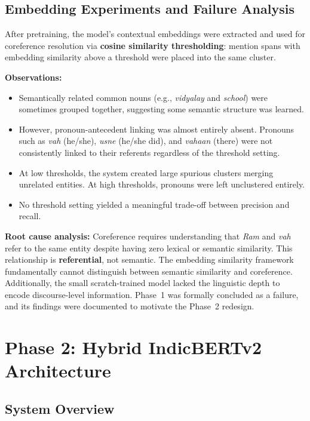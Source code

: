 \documentclass[12pt,a4paper]{report}
\begin{document}
\subsection{Embedding Experiments and Failure Analysis}

After pretraining, the model's contextual embeddings were extracted and used for coreference resolution via \textbf{cosine similarity thresholding}: mention spans with embedding similarity above a threshold were placed into the same cluster.

\textbf{Observations:}
\begin{itemize}
    \item Semantically related common nouns (e.g., \textit{vidyalay} and \textit{school}) were sometimes grouped together, suggesting some semantic structure was learned.
    \item However, pronoun-antecedent linking was almost entirely absent. Pronouns such as \textit{vah} (he/she), \textit{usne} (he/she did), and \textit{vahaan} (there) were not consistently linked to their referents regardless of the threshold setting.
    \item At low thresholds, the system created large spurious clusters merging unrelated entities. At high thresholds, pronouns were left unclustered entirely.
    \item No threshold setting yielded a meaningful trade-off between precision and recall.
\end{itemize}

\textbf{Root cause analysis:}
Coreference requires understanding that \textit{Ram} and \textit{vah} refer to the same entity despite having zero lexical or semantic similarity. This relationship is \textbf{referential}, not semantic. The embedding similarity framework fundamentally cannot distinguish between semantic similarity and coreference. Additionally, the small scratch-trained model lacked the linguistic depth to encode discourse-level information. Phase~1 was formally concluded as a failure, and its findings were documented to motivate the Phase~2 redesign.

\section{Phase 2: Hybrid IndicBERTv2 Architecture}

\subsection{System Overview}
\end{document}
